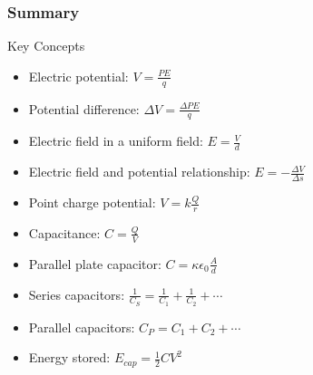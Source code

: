 \documentclass{beamer}
\begin{document}
\begin{frame}
    \frametitle{Summary}
    
    \begin{block}{Key Concepts}
        \begin{itemize}
            \item Electric potential: $V = \frac{PE}{q}$
            \item Potential difference: $\Delta V = \frac{\Delta PE}{q}$
            \item Electric field in a uniform field: $E = \frac{V}{d}$
            \item Electric field and potential relationship: $E = -\frac{\Delta V}{\Delta s}$
            \item Point charge potential: $V = k\frac{Q}{r}$
            \item Capacitance: $C = \frac{Q}{V}$
            \item Parallel plate capacitor: $C = \kappa\epsilon_0 \frac{A}{d}$
            \item Series capacitors: $\frac{1}{C_S} = \frac{1}{C_1} + \frac{1}{C_2} + \cdots$
            \item Parallel capacitors: $C_P = C_1 + C_2 + \cdots$
            \item Energy stored: $E_{cap} = \frac{1}{2}CV^2$
        \end{itemize}
    \end{block}
\end{frame}
\end{document}
